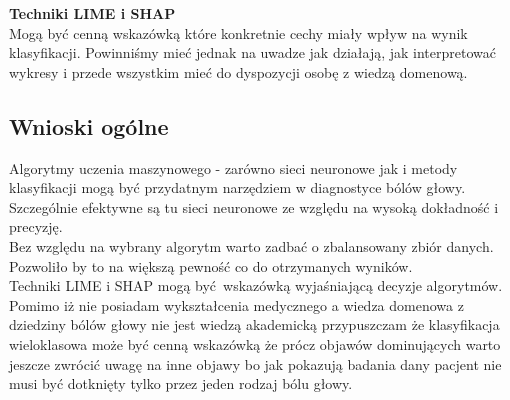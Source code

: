 \textbf{Techniki LIME i SHAP}\\
Mogą być cenną wskazówką które konkretnie cechy miały wpływ na wynik klasyfikacji. Powinniśmy mieć jednak na uwadze jak działają, jak interpretować wykresy i przede wszystkim mieć do dyspozycji osobę z wiedzą domenową.

\newpage
\subsection{Wnioski ogólne}
Algorytmy uczenia maszynowego - zarówno sieci neuronowe jak i metody klasyfikacji mogą być przydatnym narzędziem w diagnostyce bólów głowy.\\

Szczególnie efektywne są tu sieci neuronowe ze względu na wysoką dokładność i precyzję.\\

Bez względu na wybrany algorytm warto zadbać o zbalansowany zbiór danych. Pozwoliło by to na większą pewność co do otrzymanych wyników.\\

Techniki LIME i SHAP mogą być wskazówką wyjaśniającą decyzje algorytmów.\\

Pomimo iż nie posiadam wykształcenia medycznego a wiedza domenowa z dziedziny bólów głowy nie jest wiedzą akademicką przypuszczam że klasyfikacja wieloklasowa może być cenną wskazówką że prócz objawów dominujących warto jeszcze zwrócić uwagę na inne objawy bo jak pokazują badania dany pacjent nie musi być dotknięty tylko przez jeden rodzaj bólu głowy.
